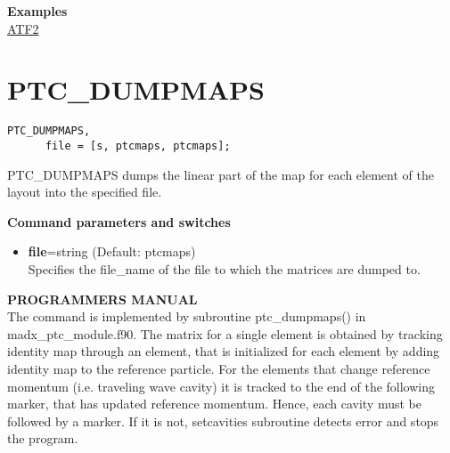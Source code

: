 {\bf Examples}\\
\href{http://cern.ch/frs/mad-X_examples/ptc_madx_interface/moments/moments.madx}{ATF2}


% 



%

\section{PTC\_DUMPMAPS}

\begin{verbatim}
PTC_DUMPMAPS, 
      file = [s, ptcmaps, ptcmaps];
\end{verbatim}

PTC\_DUMPMAPS dumps the linear part of the map for each element of the
layout into the specified file.  

{\bf Command parameters and switches}\\
\begin{itemize}
   \item {\bf file}=string  (Default: ptcmaps)\\
     Specifies the file\_name of the file to which the matrices are dumped to.   
\end{itemize}

{\bf PROGRAMMERS MANUAL} \\  
The command is implemented by subroutine ptc\_dumpmaps() in
madx\_ptc\_module.f90. The matrix for a single element is obtained by
tracking identity map through an element, that is initialized for each
element by adding identity map to the reference particle. For the
elements that change reference momentum (i.e. traveling wave cavity)  it
is tracked to the end of the following marker, that has updated
reference momentum. Hence, each cavity must be followed by a marker. If
it is not, setcavities subroutine detects error and stops the program.   
 


%

